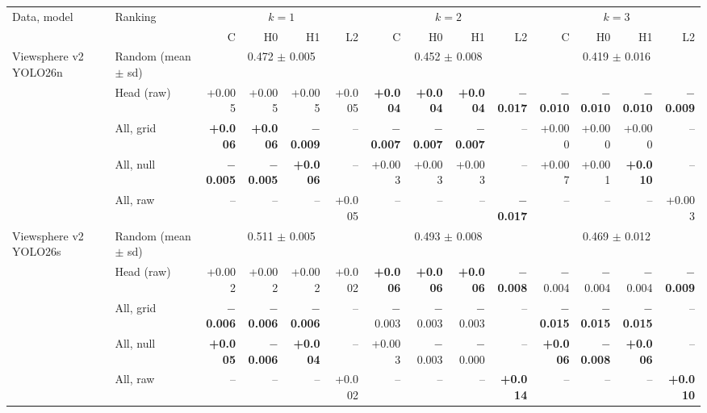 \begin{tabular}{llrrrrrrrrrrrr}
\toprule
Data, model & Ranking & \multicolumn{4}{c}{$k=1$} & \multicolumn{4}{c}{$k=2$} & \multicolumn{4}{c}{$k=3$} \\
\cmidrule(lr){3-6}\cmidrule(lr){7-10}\cmidrule(lr){11-14}
 & & C & H0 & H1 & L2 & C & H0 & H1 & L2 & C & H0 & H1 & L2 \\
\midrule
Viewsphere v2 YOLO26n & Random (mean $\pm$ sd) & \multicolumn{4}{c}{0.472 $\pm$ 0.005} & \multicolumn{4}{c}{0.452 $\pm$ 0.008} & \multicolumn{4}{c}{0.419 $\pm$ 0.016} \\
 & Head (raw) & +0.005 & +0.005 & +0.005 & +0.005 & \textbf{+0.004} & \textbf{+0.004} & \textbf{+0.004} & \textbf{$-$0.017} & \textbf{$-$0.010} & \textbf{$-$0.010} & \textbf{$-$0.010} & \textbf{$-$0.009} \\
 & All, grid & \textbf{+0.006} & \textbf{+0.006} & \textbf{$-$0.009} & -- & \textbf{$-$0.007} & \textbf{$-$0.007} & \textbf{$-$0.007} & -- & +0.000 & +0.000 & +0.000 & -- \\
 & All, null & \textbf{$-$0.005} & \textbf{$-$0.005} & \textbf{+0.006} & -- & +0.003 & +0.003 & +0.003 & -- & +0.007 & +0.001 & \textbf{+0.010} & -- \\
 & All, raw & -- & -- & -- & +0.005 & -- & -- & -- & \textbf{$-$0.017} & -- & -- & -- & +0.003 \\
\midrule
Viewsphere v2 YOLO26s & Random (mean $\pm$ sd) & \multicolumn{4}{c}{0.511 $\pm$ 0.005} & \multicolumn{4}{c}{0.493 $\pm$ 0.008} & \multicolumn{4}{c}{0.469 $\pm$ 0.012} \\
 & Head (raw) & +0.002 & +0.002 & +0.002 & +0.002 & \textbf{+0.006} & \textbf{+0.006} & \textbf{+0.006} & \textbf{$-$0.008} & $-$0.004 & $-$0.004 & $-$0.004 & \textbf{$-$0.009} \\
 & All, grid & \textbf{$-$0.006} & \textbf{$-$0.006} & \textbf{$-$0.006} & -- & $-$0.003 & $-$0.003 & $-$0.003 & -- & \textbf{$-$0.015} & \textbf{$-$0.015} & \textbf{$-$0.015} & -- \\
 & All, null & \textbf{+0.005} & \textbf{$-$0.006} & \textbf{+0.004} & -- & +0.003 & $-$0.003 & $-$0.000 & -- & \textbf{+0.006} & \textbf{$-$0.008} & \textbf{+0.006} & -- \\
 & All, raw & -- & -- & -- & +0.002 & -- & -- & -- & \textbf{+0.014} & -- & -- & -- & \textbf{+0.010} \\
\bottomrule
\end{tabular}
